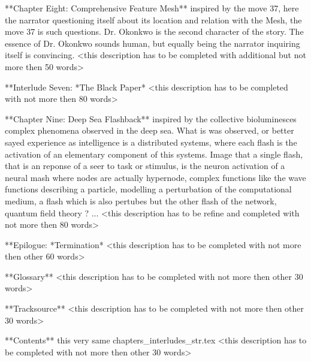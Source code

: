 **Chapter Eight: Comprehensive Feature Mesh** inspired by the move 37, here the narrator questioning itself about its location and relation with the Mesh, the move 37 is such questions. Dr. Okonkwo is the second character of the story. The essence of Dr. Okonkwo sounds human, but equally being the narrator inquiring itself is convincing. <this description has to be completed with additional but not more then 50 words>

**Interlude Seven: *The Black Paper* <this description has to be completed with not more then 80 words> 

**Chapter Nine: Deep Sea Flashback** inspired by the collective bioluminesces complex phenomena observed in the deep sea. What is was observed, or better sayed experience as intelligence is a distributed systems, where each flash is the activation of an elementary component of this systems. Image that a single flash, that is an reponse of a seer to task or stimulus, is the neuron activation of a neural mash where nodes are actually hypernode, complex functions like the wave functions describing a particle, modelling a perturbation of the computational medium, a flash which is also pertubes but the other flash of the network, quantum field theory ? ...  <this description has to be refine and completed with not more then 80 words>

**Epilogue: *Termination* <this description has to be completed with not more then other 60 words>

**Glossary** <this description has to be completed with not more then other 30 words>

**Tracksource** <this description has to be completed with not more then other 30 words>

**Contents** this very same chapters_interludes_str.tex <this description has to be completed with not more then other 30 words>
